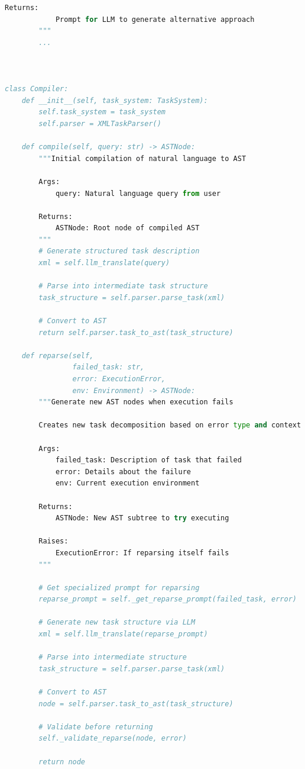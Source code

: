 \documentclass{article}
\begin{document}
\begin{lstlisting}[language=Python]
        Returns:
            Prompt for LLM to generate alternative approach
        """
        ...



class Compiler:
    def __init__(self, task_system: TaskSystem):
        self.task_system = task_system
        self.parser = XMLTaskParser()

    def compile(self, query: str) -> ASTNode:
        """Initial compilation of natural language to AST
        
        Args:
            query: Natural language query from user
            
        Returns:
            ASTNode: Root node of compiled AST
        """
        # Generate structured task description
        xml = self.llm_translate(query)
        
        # Parse into intermediate task structure
        task_structure = self.parser.parse_task(xml)
        
        # Convert to AST
        return self.parser.task_to_ast(task_structure)

    def reparse(self, 
                failed_task: str,
                error: ExecutionError,
                env: Environment) -> ASTNode:
        """Generate new AST nodes when execution fails
        
        Creates new task decomposition based on error type and context.
        
        Args:
            failed_task: Description of task that failed
            error: Details about the failure
            env: Current execution environment
            
        Returns:
            ASTNode: New AST subtree to try executing
            
        Raises:
            ExecutionError: If reparsing itself fails
        """

        # Get specialized prompt for reparsing
        reparse_prompt = self._get_reparse_prompt(failed_task, error)
        
        # Generate new task structure via LLM
        xml = self.llm_translate(reparse_prompt)
        
        # Parse into intermediate structure
        task_structure = self.parser.parse_task(xml)
        
        # Convert to AST
        node = self.parser.task_to_ast(task_structure)
        
        # Validate before returning
        self._validate_reparse(node, error)
        
        return node


\end{lstlisting}
\end{document}
